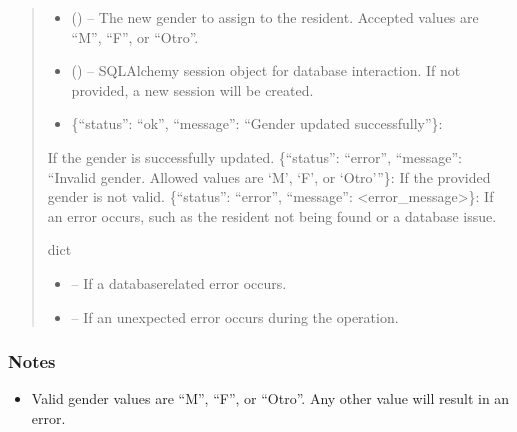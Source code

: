 \documentclass[letterpaper,10pt,english]{sphinxmanual}
\begin{document}
\begin{fulllineitems}
\begin{fulllineitems}
\begin{quote}
\begin{description}
\begin{itemize}
\item {} 
\sphinxAtStartPar
{} () – The new gender to assign to the resident. Accepted values are “M”, “F”, or “Otro”.

\item {} 
\sphinxAtStartPar
{} (\sphinxstyleliteralemphasis{\sphinxupquote{, }}) – SQLAlchemy session object for database interaction.
If not provided, a new session will be created.

\end{itemize}

\sphinxAtStartPar
\begin{description}
\begin{itemize}
\item {} 
\sphinxAtStartPar
\{“status”: “ok”, “message”: “Gender updated successfully”\}:

\end{itemize}

\sphinxAtStartPar
If the gender is successfully updated.
\sphinxhyphen{} \{“status”: “error”, “message”: “Invalid gender. Allowed values are ‘M’, ‘F’, or ‘Otro’”\}:
If the provided gender is not valid.
\sphinxhyphen{} \{“status”: “error”, “message”: <error\_message>\}:
If an error occurs, such as the resident not being found or a database issue.

\end{description}


\sphinxAtStartPar
dict

\begin{itemize}
\item {} 
\sphinxAtStartPar
{} – If a database\sphinxhyphen{}related error occurs.

\item {} 
\sphinxAtStartPar
{} – If an unexpected error occurs during the operation.

\end{itemize}

\end{description}\end{quote}
\subsubsection*{Notes}
\begin{itemize}
\item {} 
\sphinxAtStartPar
Valid gender values are “M”, “F”, or “Otro”. Any other value will result in an error.


\end{itemize}
\end{fulllineitems}
\end{fulllineitems}
\end{document}
